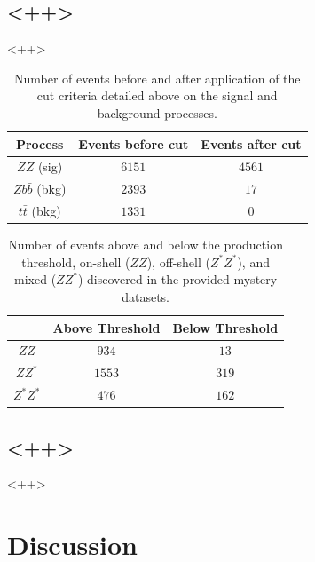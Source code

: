 \documentclass[twoside,        %
               BCOR12mm,       %
               ngerman,english, %
               fleqn,headsepline=false,footsepline=false
              ]{Vorlage/MFPREPORT}
\begin{document}
\subsection{<++>}<++>

\begin{table}
\centering
\begin{tabular}{|c|c|c|}
\hline
Process& Events before cut& Events after cut\\
\hline
$ZZ$ (sig)&$6151$&$4561$\\
\hline
$Zb\bar b$ (bkg)& $2393$&$17$\\
\hline
$t\bar t$ (bkg)&$1331$&$0$\\
\hline
\end{tabular}
\caption{Number of events before and after
application of the cut criteria detailed
above on the signal and background
processes.}
\label{tab:cutresults}
\end{table}



\begin{table}
\centering
\begin{tabular}{|c|c|c|}
\hline
& Above Threshold& Below
Threshold\\
\hline
$ZZ$&$934$&$13$\\
\hline
$ZZ^*$& $1553$&$319$\\
\hline
$Z^*Z^*$&$476$&$162$\\
\hline
\end{tabular}
\caption{Number
of events
above and
below the
production
threshold,
on-shell
($ZZ$),
off-shell
($Z^*Z^*$),
and mixed
($ZZ^*$)
discovered in
the provided
mystery
datasets.}
\label{tab:ZZcount}
\end{table}

\subsection{<++>}<++>






\section{Discussion}
\label{sec:discussion}



\newpage

\begin{appendices}
\end{appendices}
\end{document}
